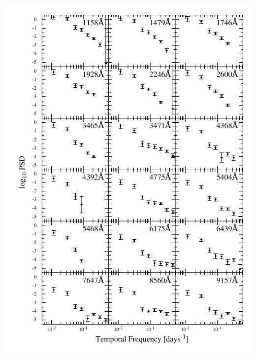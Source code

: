 \documentclass[11pt,letterpaper]{article}
\begin{document}
\includegraphics{../img/psd_atlas_err0.pdf}
\end{document}
